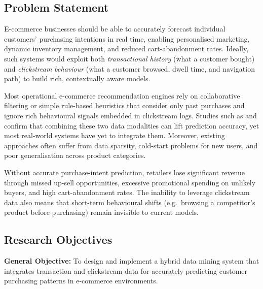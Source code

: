 \documentclass[12pt,a4paper]{article}
\begin{document}
\subsection{Problem Statement}

E-commerce businesses should be able to accurately forecast individual customers'
purchasing intentions in real time, enabling personalised marketing, dynamic inventory
management, and reduced cart-abandonment rates. Ideally, such systems would exploit
both \emph{transactional history} (what a customer bought) and \emph{clickstream behaviour}
(what a customer browsed, dwell time, and navigation path) to build rich, contextually
aware models.

Most operational e-commerce recommendation engines rely on collaborative filtering or
simple rule-based heuristics that consider only past purchases and ignore rich behavioural
signals embedded in clickstream logs. Studies such as \cite{kumar2022clickstream} and
\cite{zhang2023deep} confirm that combining these two data modalities can lift prediction
accuracy, yet most real-world systems have yet to integrate them. Moreover, existing
approaches often suffer from data sparsity, cold-start problems for new users, and poor
generalisation across product categories.

Without accurate purchase-intent prediction, retailers lose significant revenue through
missed up-sell opportunities, excessive promotional spending on unlikely buyers, and
high cart-abandonment rates. The inability to leverage clickstream data also means that
short-term behavioural shifts (e.g.\ browsing a competitor's product before purchasing)
remain invisible to current models.

\subsection{Research Objectives}

\textbf{General Objective:}
To design and implement a hybrid data mining system that integrates transaction and
clickstream data for accurately predicting customer purchasing patterns in e-commerce
environments.
\end{document}
